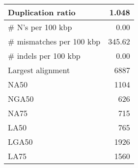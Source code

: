 \documentclass[12pt,a4paper]{article}
\begin{document}
\begin{table}[ht]
\begin{center}
\begin{tabular}{|l*{1}{|r}|}
Duplication ratio & 1.048 \\ \hline
\# N's per 100 kbp & 0.00 \\ \hline
\# mismatches per 100 kbp & 345.62 \\ \hline
\# indels per 100 kbp & 0.00 \\ \hline
Largest alignment & 6887 \\ \hline
NA50 & 1104 \\ \hline
NGA50 & 626 \\ \hline
NA75 & 715 \\ \hline
LA50 & 765 \\ \hline
LGA50 & 1926 \\ \hline
LA75 & 1560 \\ \hline
\end{tabular}
\end{center}
\end{table}
\end{document}
